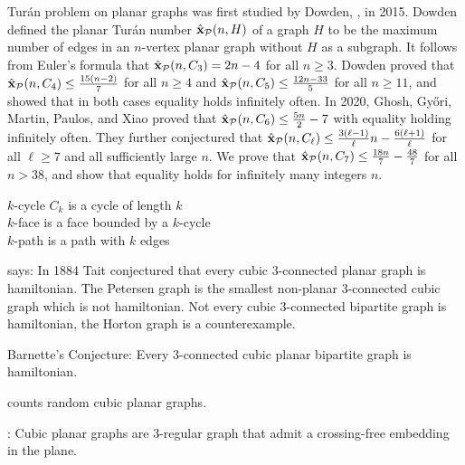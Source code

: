 \begin{description}
Tur{\'a}n problem on planar graphs was first studied by Dowden,
,
in 2015. Dowden defined the planar Tur\'an number ${\hat{\bf x}}_{\mathcal{P}}(n,H)$ of
a graph $H$ to be the maximum number of edges in an $n$-vertex planar graph
without $H$ as a subgraph. It follows from Euler's formula that
${\hat{\bf x}}_{\mathcal{P}}(n, C_3) = 2n - 4$ for all $n \ge 3$. Dowden proved that
${\hat{\bf x}}_{\mathcal{P}}(n, C_4) \le \frac{15(n-2)}{7}$ for all $n \ge 4$ and
${\hat{\bf x}}_{\mathcal{P}}(n, C_5) \le \frac{12n - 33}{5}$ for all $n \ge 11$, and
showed that in both cases equality holds infinitely often. In 2020, Ghosh,
Gy\H ori, Martin, Paulos, and Xiao  proved that
${\hat{\bf x}}_{\mathcal{P}}(n, C_6) \le \frac{5n}{2} - 7$ with equality holding
infinitely often. They further conjectured that ${\hat{\bf x}}_{\mathcal{P}}(n,
C_{\ell}) \le \frac{3(\ell - 1)}{\ell}n - \frac{6(\ell + 1)}{\ell}$ for all
$\ell \ge 7$ and all sufficiently large $n$. We prove that
${\hat{\bf x}}_{\mathcal{P}}(n,C_7) \le \frac{18n}{7} - \frac{48}{7}$ for all $n > 38$,
and show that equality holds for infinitely many integers $n$.

$k$-cycle $C_{k}$ is a cycle of length $k$
\\
$k$-face is a face bounded by a $k$-cycle
\\
$k$-path is a path with $k$ edges

 says: In 1884 Tait conjectured that every cubic
3-connected planar graph is hamiltonian.
The Petersen graph is the smallest
non-planar 3-connected cubic graph which is not hamiltonian.
Not every cubic 3-connected bipartite graph is hamiltonian,
the Horton graph is a counterexample.

Barnette's Conjecture:
Every 3-connected cubic planar bipartite graph is hamiltonian.

 counts random cubic planar graphs.

:
Cubic planar graphs are 3-regular graph that admit a crossing-free embedding in
the plane.

\end{description}


\printbibliography[heading=subbibintoc,title={References}]
